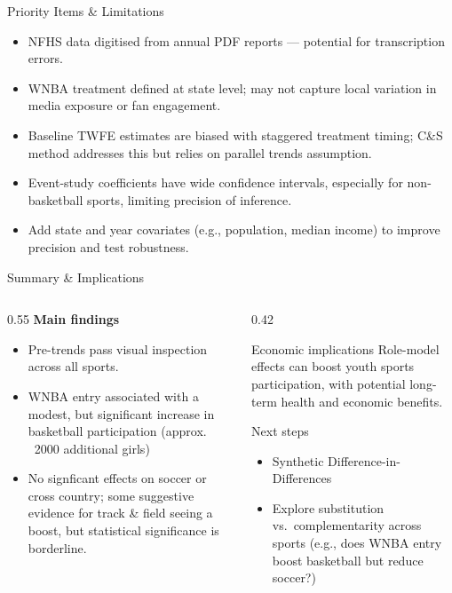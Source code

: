 \documentclass[aspectratio=169, 12pt]{beamer}
\begin{document}
\begin{frame}{Priority Items \& Limitations}
  \begin{itemize}
    \item NFHS data digitised from annual PDF reports — potential for transcription errors. 
    \item WNBA treatment defined at state level; may not capture local variation in media exposure or fan engagement.
    \item Baseline TWFE estimates are biased with staggered treatment timing; C\&S method addresses this but relies on parallel trends assumption.
    \item Event-study coefficients have wide confidence intervals, especially for non-basketball sports, limiting precision of inference.
    \item Add state and year covariates (e.g., population, median income) to improve precision and test robustness.
  \end{itemize}
\end{frame}
\begin{frame}{Summary \& Implications}
  \begin{columns}[T]
    \begin{column}{0.55\textwidth}
      \textbf{Main findings}
      \begin{itemize}
        \item Pre-trends pass visual inspection across all sports.
        \item WNBA entry associated with a modest, but significant increase in basketball participation (approx. \ 2000 additional girls)
        \item No signficant effects on soccer or cross country; some suggestive evidence for track \& field seeing a boost, but statistical significance is borderline.
      \end{itemize}
    \end{column}
    \begin{column}{0.42\textwidth}
      \begin{block}{Economic implications}
        \small
          Role-model effects can boost youth sports participation, with potential long-term health and economic benefits.
      \end{block}
      \vspace{0.4em}
      \begin{block}{Next steps}
        \small
        \begin{itemize}
          \item Synthetic Difference-in-Differences
          \item Explore substitution vs.\ complementarity across sports (e.g., does WNBA entry boost basketball but reduce soccer?)
        \end{itemize}
      \end{block}
    \end{column}
  \end{columns}
\end{frame}
\end{document}
